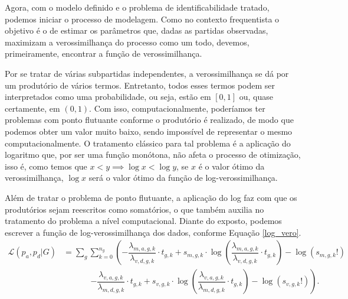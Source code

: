 Agora, com o modelo definido e o problema de identificabilidade tratado, podemos iniciar o processo de modelagem. Como no contexto frequentista o objetivo é o de estimar os parâmetros que, dadas as partidas observadas, maximizam a verossimilhança do processo como um todo, devemos, primeiramente, encontrar a função de verossimilhança.

Por se tratar de várias subpartidas independentes, a verossimilhança se dá por um produtório de vários termos. Entretanto, todos esses termos podem ser interpretados como uma probabilidade, ou seja, estão em $[0, 1]$ ou, quase certamente, em $(0, 1)$. Com isso, computacionalmente, poderíamos ter problemas com ponto flutuante conforme o produtório é realizado, de modo que podemos obter um valor muito baixo, sendo impossível de representar o mesmo computacionalmente. O tratamento clássico para tal problema é a aplicação do logaritmo que, por ser uma função monótona, não afeta o processo de otimização, isso é, como temos que $x < y \implies \log{x} < \log{y}$, se $x$ é o valor ótimo da verossimilhança, $\log{x}$ será o valor ótimo da função de log-verossimilhança.

Além de tratar o problema de ponto flutuante, a aplicação do log faz com que os produtórios sejam reescritos como somatórios, o que também auxilia no tratamento do problema a nível computacional. Diante do exposto, podemos escrever a função de log-verossimilhança dos dados, conforme Equação \ref{log_vero}.
\begin{equation}
    \begin{split}
        \mathcal{L}(p_a, p_d | G) & = \sum_{g}\sum_{k = 0}^{n_g}\left(-\dfrac{\lambda_{m, a, g, k}}{\lambda_{v, d, g, k}}\cdot t_{g, k} + s_{m, g, k}\cdot \log{\left(\dfrac{\lambda_{m, a, g, k}}{\lambda_{v, d, g, k}}\cdot t_{g, k}\right)} - \log{\left(s_{m, g, k}!\right)}\right. \\
        & ~~~~~~~~~~~~~~~ \left. -\dfrac{\lambda_{v, a, g, k}}{\lambda_{m, d, g, k}}\cdot t_{g, k} + s_{v, g, k}\cdot \log{\left(\dfrac{\lambda_{v, a, g, k}}{\lambda_{m, d, g, k}}\cdot t_{g, k}\right)} - \log{\left(s_{v, g, k}!\right)}\right).
    \end{split}
    \label{log_vero}
\end{equation}

